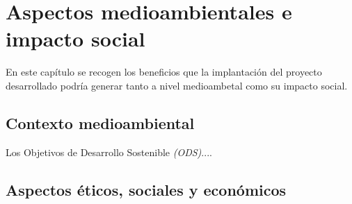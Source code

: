\chapter{Aspectos medioambientales e impacto social}
\label{chapter:aspectos}

En este capítulo se recogen los beneficios que la implantación del proyecto desarrollado podría generar tanto a nivel medioambetal como su impacto social.

\section{Contexto medioambiental}

Los Objetivos de Desarrollo Sostenible \textit{(ODS)}....


\section{Aspectos éticos, sociales y económicos}

